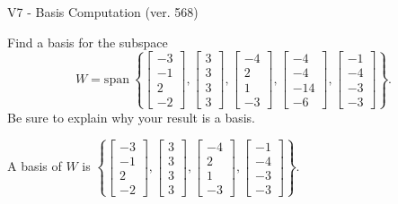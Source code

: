 \begin{exercise}
  \begin{exerciseTitle}V7 - Basis Computation (ver. 568)\end{exerciseTitle}
  \begin{exerciseStatement}
    Find a basis for the subspace 
\[W=\mathrm{span}\ \left\{\left[\begin{array}{r}
-3 \\
-1 \\
2 \\
-2
\end{array}\right] , \left[\begin{array}{r}
3 \\
3 \\
3 \\
3
\end{array}\right] , \left[\begin{array}{r}
-4 \\
2 \\
1 \\
-3
\end{array}\right] , \left[\begin{array}{r}
-4 \\
-4 \\
-14 \\
-6
\end{array}\right] , \left[\begin{array}{r}
-1 \\
-4 \\
-3 \\
-3
\end{array}\right]\right\}.\]
 Be sure to explain why your result is a basis.


  \end{exerciseStatement}
  \begin{exerciseAnswer}
   A basis of \(W\) is  \(\left\{\left[\begin{array}{r}
-3 \\
-1 \\
2 \\
-2
\end{array}\right] , \left[\begin{array}{r}
3 \\
3 \\
3 \\
3
\end{array}\right] , \left[\begin{array}{r}
-4 \\
2 \\
1 \\
-3
\end{array}\right] , \left[\begin{array}{r}
-1 \\
-4 \\
-3 \\
-3
\end{array}\right]\right\}\).
  


  \end{exerciseAnswer}
\end{exercise}